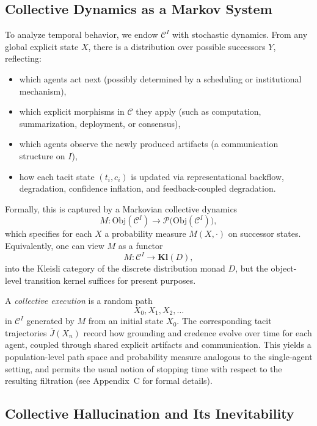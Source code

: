 \documentclass[11pt]{article}
\theoremstyle{definition}
\begin{document}
\subsection{Collective Dynamics as a Markov System}

To analyze temporal behavior, we endow $\mathcal{C}^I$ with stochastic
dynamics. From any global explicit state $X$, there is a distribution over
possible successors $Y$, reflecting:
\begin{itemize}
  \item which agents act next (possibly determined by a scheduling or
        institutional mechanism),
  \item which explicit morphisms in $\mathcal{C}$ they apply (such as
        computation, summarization, deployment, or consensus),
  \item which agents observe the newly produced artifacts (a communication
        structure on $I$),
  \item how each tacit state $(t_i,c_i)$ is updated via representational
        backflow, degradation, confidence inflation, and feedback-coupled
        degradation.
\end{itemize}

Formally, this is captured by a Markovian collective dynamics
\[
  M : \mathrm{Obj}(\mathcal{C}^I)
    \longrightarrow \mathcal{P}\bigl( \mathrm{Obj}(\mathcal{C}^I) \bigr),
\]
which specifies for each $X$ a probability measure $M(X,\cdot)$ on successor
states. Equivalently, one can view $M$ as a functor
\[
  M : \mathcal{C}^I \longrightarrow \mathbf{Kl}(D),
\]
into the Kleisli category of the discrete distribution monad $D$, but the
object-level transition kernel suffices for present purposes.

A \emph{collective execution} is a random path
\[
  X_0, X_1, X_2, \dots
\]
in $\mathcal{C}^I$ generated by $M$ from an initial state $X_0$. The
corresponding tacit trajectories $\overline{J}(X_n)$ record how grounding
and credence evolve over time for each agent, coupled through shared
explicit artifacts and communication. This yields a population-level path
space and probability measure analogous to the single-agent setting, and
permits the usual notion of stopping time with respect to the resulting
filtration (see Appendix~C for formal details).

\subsection{Collective Hallucination and Its Inevitability}
\end{document}
